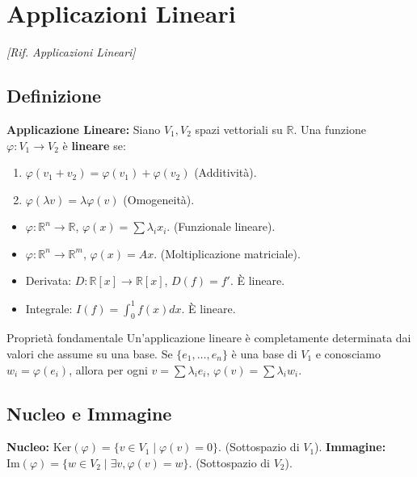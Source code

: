 \section{Applicazioni Lineari}
\emph{[Rif. Applicazioni Lineari]}

\subsection{Definizione}
\begin{definitionbox}
\textbf{Applicazione Lineare:} Siano $V_1, V_2$ spazi vettoriali su $\mathbb{R}$. Una funzione $\varphi: V_1 \to V_2$ è \textbf{lineare} se:
\begin{enumerate}
    \item $\varphi(v_1 + v_2) = \varphi(v_1) + \varphi(v_2)$ (Additività).
    \item $\varphi(\lambda v) = \lambda \varphi(v)$ (Omogeneità).
\end{enumerate}
\end{definitionbox}

\begin{exercisebox}[title={Esempi}]
\begin{itemize}
    \item $\varphi: \mathbb{R}^n \to \mathbb{R}$, $\varphi(x) = \sum \lambda_i x_i$. (Funzionale lineare).
    \item $\varphi: \mathbb{R}^n \to \mathbb{R}^m$, $\varphi(x) = Ax$. (Moltiplicazione matriciale).
    \item Derivata: $D: \mathbb{R}[x] \to \mathbb{R}[x]$, $D(f) = f'$. È lineare.
    \item Integrale: $I(f) = \int_0^1 f(x)dx$. È lineare.
\end{itemize}
\end{exercisebox}

\begin{concept}{Proprietà fondamentale}
Un'applicazione lineare è completamente determinata dai valori che assume su una base.
Se $\{e_1, \dots, e_n\}$ è una base di $V_1$ e conosciamo $w_i = \varphi(e_i)$, allora per ogni $v = \sum \lambda_i e_i$,
$\varphi(v) = \sum \lambda_i w_i$.
\end{concept}

\subsection{Nucleo e Immagine}
\begin{definitionbox}
\textbf{Nucleo:} $\text{Ker}(\varphi) = \{ v \in V_1 \mid \varphi(v) = 0 \}$. (Sottospazio di $V_1$).
\textbf{Immagine:} $\text{Im}(\varphi) = \{ w \in V_2 \mid \exists v, \varphi(v)=w \}$. (Sottospazio di $V_2$).
\end{definitionbox}

